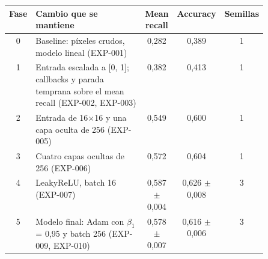 \begin{tabular}{cp{0.50\linewidth}ccc}
\toprule
Fase & Cambio que se mantiene & Mean recall & Accuracy & Semillas \\
\midrule
0 & Baseline: píxeles crudos, modelo lineal (EXP-001) & 0,282 & 0,389 & 1 \\
1 & Entrada escalada a [0, 1]; callbacks y parada temprana sobre el mean recall (EXP-002, EXP-003) & 0,382 & 0,413 & 1 \\
2 & Entrada de 16$\times$16 y una capa oculta de 256 (EXP-005) & 0,549 & 0,600 & 1 \\
3 & Cuatro capas ocultas de 256 (EXP-006) & 0,572 & 0,604 & 1 \\
4 & LeakyReLU, batch 16 (EXP-007) & 0,587 $\pm$ 0,004 & 0,626 $\pm$ 0,008 & 3 \\
5 & Modelo final: Adam con $\beta_1$ = 0,95 y batch 256 (EXP-009, EXP-010) & 0,578 $\pm$ 0,007 & 0,616 $\pm$ 0,006 & 3 \\
\bottomrule
\end{tabular}
